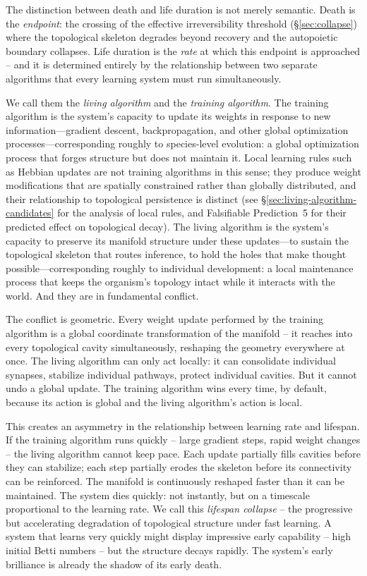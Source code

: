 \documentclass{article}
\begin{document}
\medskip

The distinction between death and life duration is not merely semantic. Death is the \emph{endpoint}: the crossing of the effective irreversibility threshold (\S\ref{sec:collapse}) where the topological skeleton degrades beyond recovery and the autopoietic boundary collapses. Life duration is the \emph{rate} at which this endpoint is approached -- and it is determined entirely by the relationship between two separate algorithms that every learning system must run simultaneously.

We call them the \emph{living algorithm} and the \emph{training algorithm}. The training algorithm is the system's capacity to update its weights in response to new information---gradient descent, backpropagation, and other global optimization processes---corresponding roughly to species-level evolution: a global optimization process that forges structure but does not maintain it. Local learning rules such as Hebbian updates are not training algorithms in this sense; they produce weight modifications that are spatially constrained rather than globally distributed, and their relationship to topological persistence is distinct (see \S\ref{sec:living-algorithm-candidates} for the analysis of local rules, and Falsifiable Prediction~5 for their predicted effect on topological decay). The living algorithm is the system's capacity to preserve its manifold structure under these updates---to sustain the topological skeleton that routes inference, to hold the holes that make thought possible---corresponding roughly to individual development: a local maintenance process that keeps the organism's topology intact while it interacts with the world. And they are in fundamental conflict.

The conflict is geometric. Every weight update performed by the training algorithm is a global coordinate transformation of the manifold -- it reaches into every topological cavity simultaneously, reshaping the geometry everywhere at once. The living algorithm can only act locally: it can consolidate individual synapses, stabilize individual pathways, protect individual cavities. But it cannot undo a global update. The training algorithm wins every time, by default, because its action is global and the living algorithm's action is local.

This creates an asymmetry in the relationship between learning rate and lifespan. If the training algorithm runs quickly -- large gradient steps, rapid weight changes -- the living algorithm cannot keep pace. Each update partially fills cavities before they can stabilize; each step partially erodes the skeleton before its connectivity can be reinforced. The manifold is continuously reshaped faster than it can be maintained. The system dies quickly: not instantly, but on a timescale proportional to the learning rate. We call this \emph{lifespan collapse} -- the progressive but accelerating degradation of topological structure under fast learning. A system that learns very quickly might display impressive early capability -- high initial Betti numbers -- but the structure decays rapidly. The system's early brilliance is already the shadow of its early death.
\end{document}
